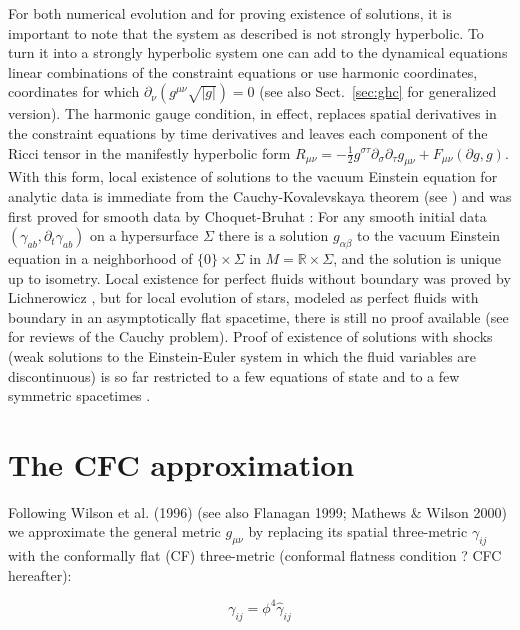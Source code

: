 \documentclass[12pt]{article}
\def\a{\alpha}
\def\b{\beta}
\newcommand{\pa}{\partial}
\def\a{\alpha}
\def\b{\beta}
\begin{document}
{       
For both numerical evolution and for proving existence of solutions, 
it is important to note that the system as described is not strongly 
hyperbolic.  To turn it into a strongly hyperbolic system one can 
add to the dynamical equations linear combinations of the constraint 
equations 
 or use harmonic 
coordinates, coordinates for which $\partial_\nu ( g^{\mu\nu}\sqrt{|g|}) = 0$
(see also Sect.~\ref{sec:ghc} for generalized version). 
The harmonic gauge condition, in effect, replaces spatial derivatives in the 
constraint equations by time derivatives and leaves each component of
the Ricci tensor in the manifestly hyperbolic form
$R_{\mu\nu}= -\frac12 g^{\sigma\tau}\pa_\sigma\partial_\tau g_{\mu\nu} 
+ F_{\mu\nu}(\partial g, g)$. With this form, local existence of solutions 
to the vacuum Einstein equation for analytic data is immediate from the 
Cauchy-Kovalevskaya theorem (see \cite{Courant1962}) and was first 
proved for smooth data by Choquet-Bruhat \cite{Choquet-Bruhat1956}:
For any smooth initial data $(\gamma_{ab}, \partial_t\gamma_{ab})$
on a hypersurface $\Sigma$ there is a solution $g_{\a\b}$ to the 
vacuum Einstein equation in a neighborhood of $\{0\}\times\Sigma$ in
$M={\mathbb R}\times\Sigma$, and the solution is unique up to isometry.
Local existence for perfect fluids without boundary was proved by 
Lichnerowicz \cite{lichnerowicz67}, but for local evolution of stars, 
modeled as perfect fluids with boundary in an asymptotically flat 
spacetime, there is still no proof available (see 
\cite{Choquet-Bruhat1980,Rendall2005} for reviews of the Cauchy problem). 
Proof of existence of solutions with shocks (weak solutions to the Einstein-Euler system
in which the fluid variables are discontinuous)  is so far restricted to a few 
equations of state and to a few symmetric spacetimes \cite{gst07,ls05,blss04}.

\section{The CFC approximation}

Following Wilson et al. (1996) (see also Flanagan 1999; Mathews \& Wilson 2000) we approximate the general metric $g_{\mu\nu}$ by replacing its spatial three-metric $\gamma_{ij}$ with the conformally flat (CF) three-metric (conformal flatness condition ? CFC hereafter):

\begin{equation}
\gamma_{i j}=\phi^{4} \hat{\gamma}_{i j}
\end{equation}

}
\end{document}
